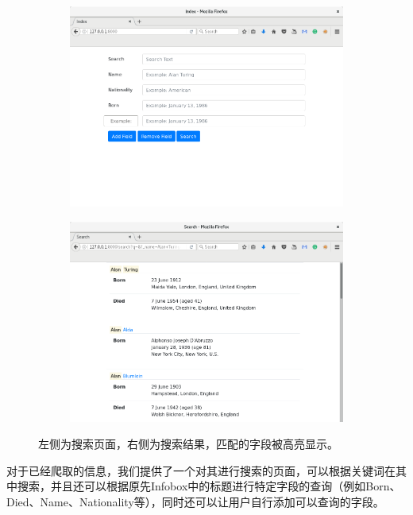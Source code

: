 \documentclass[11pt,a4paper]{article}
\begin{document}
\begin{figure}[H]
	\centering
	\begin{subfigure}{.49\textwidth}
		\centering
		\includegraphics[width=\linewidth]{img-1.png}
	\end{subfigure}
	\hfill
	\begin{subfigure}{.49\textwidth}
		\centering
		\includegraphics[width=\linewidth]{img-2.png}
	\end{subfigure}
	\caption{左侧为搜索页面，右侧为搜索结果，匹配的字段被高亮显示。}
\end{figure}

对于已经爬取的信息，我们提供了一个对其进行搜索的页面，可以根据关键词在其中搜索，并且还可以根据原先Infobox中的标题进行特定字段的查询（例如Born、Died、Name、Nationality等），同时还可以让用户自行添加可以查询的字段。
\end{document}
